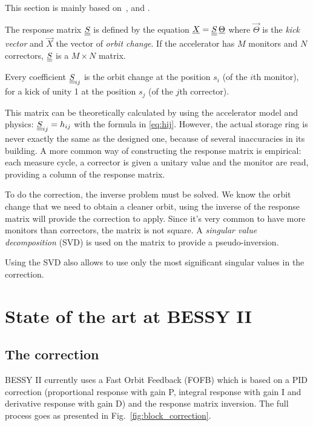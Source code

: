 This section is mainly based on~\cite{book:wille}, \cite{art:decker-1991} and \cite{art:plouviez-1999}.

The response matrix $\underline{\underline{S}}$ is defined by the equation $\underline{X} = \underline{\underline{S}}\, \underline{\Theta}$ where $\vec{\Theta}$ is the \emph{kick vector} and $\vec{X}$ the vector of \emph{orbit change}. If the accelerator has $M$ monitors and $N$ correctors, $\underline{\underline{S}}$ is a $M \times N$ matrix.

Every coefficient $\underline{\underline{S}}_{ij}$ is the orbit change at the position $s_i$ (of the $i$th monitor), for a kick of unity 1 at the position $s_j$ (of the $j$th corrector).

This matrix can be theoretically calculated by using the accelerator model and physics: $\underline{\underline{S}}_{ij} = h_{ij}$ with the formula in \eqref{eq:hij}. However, the actual storage ring is never exactly the same as the designed one, because of several inaccuracies in its building. A more common way of constructing the response matrix is empirical: each measure cycle, a corrector is given a unitary value and the monitor are read, providing a column of the response matrix.

To do the correction, the inverse problem must be solved. We know the orbit change that we need to obtain a cleaner orbit, using the inverse of the response matrix will provide the correction to apply. Since it's very common to have more monitors than correctors, the matrix is not square. A \emph{singular value decomposition} (SVD) is used on the matrix to provide a pseudo-inversion.

Using the SVD also allows to use only the most significant singular values in the correction.

\section{State of the art at BESSY II}

\subsection{The correction}
BESSY II currently uses a Fast Orbit Feedback (FOFB) which is based on a PID correction (proportional response with gain P, integral response with gain I and derivative response with gain D) and the response matrix inversion. The full process goes as presented in Fig.~\ref{fig:block_correction}.

